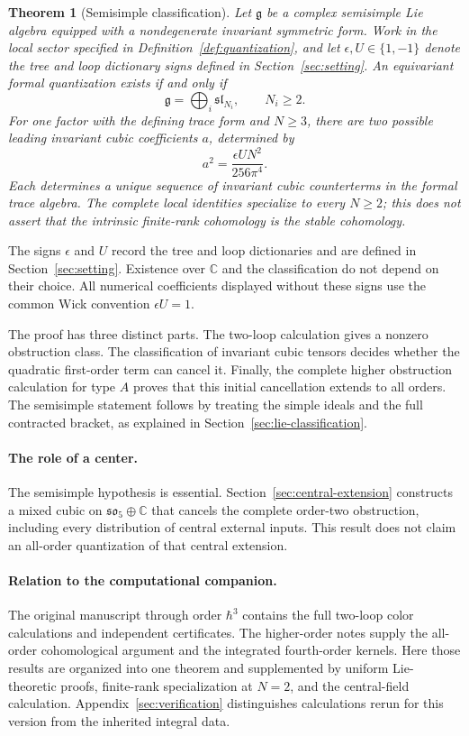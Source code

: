 \documentclass[11pt,a4paper]{article}
\numberwithin{equation}{section}
\newtheorem{theorem}{Theorem}[section]
\theoremstyle{definition}
\theoremstyle{remark}
\newcommand{\g}{\mathfrak g}
\begin{document}
\begin{theorem}[Semisimple classification]\label{thm:main}
Let $\g$ be a complex semisimple Lie algebra equipped with a
nondegenerate invariant symmetric form. Work in the local sector
specified in Definition~\ref{def:quantization}, and let
$\epsilon,U\in\{1,-1\}$ denote the tree and loop dictionary signs
defined in Section~\ref{sec:setting}. An equivariant formal
quantization exists if and only if
\[
 \g=\bigoplus_i\mathfrak{sl}_{N_i},\qquad N_i\ge2.
\]
For one factor with the defining trace form and $N\ge3$, there are two
possible leading invariant cubic coefficients $a$, determined by
\[
 a^2=\frac{\epsilon U N^2}{256\pi^4}.
\]
Each determines a unique sequence of invariant cubic counterterms in
the formal trace algebra. The complete local identities specialize to
every $N\ge2$; this does not assert that the intrinsic finite-rank
cohomology is the stable cohomology.
\end{theorem}

The signs $\epsilon$ and $U$ record the tree and loop dictionaries and
are defined in Section~\ref{sec:setting}. Existence over $\mathbb C$ and
the classification do not depend on their choice. All numerical
coefficients displayed without these signs use the common Wick
convention $\epsilon U=1$.

The proof has three distinct parts. The two-loop calculation gives a
nonzero obstruction class. The classification of invariant cubic
tensors decides whether the quadratic first-order term can cancel
it. Finally, the complete higher obstruction calculation for type
$A$ proves that this initial cancellation extends to all orders.
The semisimple statement follows by treating the simple ideals and
the full contracted bracket, as explained in
Section~\ref{sec:lie-classification}.

\paragraph{The role of a center.}
The semisimple hypothesis is essential. Section~\ref{sec:central-extension}
constructs a mixed cubic on $\mathfrak{so}_5\oplus\mathbb C$ that
cancels the complete order-two obstruction, including every
distribution of central external inputs. This result does not
claim an all-order quantization of that central extension.

\paragraph{Relation to the computational companion.}
The original manuscript through order $\hbar^3$ \cite{RepoOriginal} contains
the full two-loop color calculations and independent certificates.
The higher-order notes \cite{RepoHigher} supply the all-order
cohomological argument and the integrated fourth-order kernels.
Here those results are organized into one theorem and supplemented
by uniform Lie-theoretic proofs, finite-rank specialization at $N=2$,
and the central-field calculation. Appendix~\ref{sec:verification}
distinguishes calculations rerun for this version from the inherited
integral data.
\end{document}
